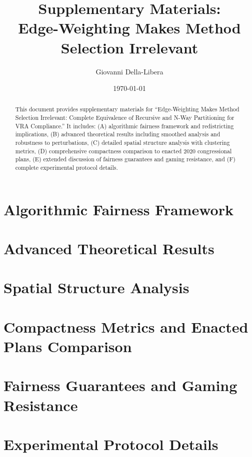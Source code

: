\documentclass[12pt,letterpaper]{article}
\title{\textbf{Supplementary Materials:\\
Edge-Weighting Makes Method Selection Irrelevant}}
\author{
    Giovanni Della-Libera
}
\date{\today}
\begin{document}
\maketitle

\begin{abstract}
This document provides supplementary materials for ``Edge-Weighting Makes Method Selection Irrelevant: Complete Equivalence of Recursive and N-Way Partitioning for VRA Compliance.'' It includes: (A) algorithmic fairness framework and redistricting implications, (B) advanced theoretical results including smoothed analysis and robustness to perturbations, (C) detailed spatial structure analysis with clustering metrics, (D) comprehensive compactness comparison to enacted 2020 congressional plans, (E) extended discussion of fairness guarantees and gaming resistance, and (F) complete experimental protocol details.
\end{abstract}

\singlespacing
\tableofcontents
\clearpage

\doublespacing

\appendix

\section{Algorithmic Fairness Framework}
\label{sup:fairness}


\section{Advanced Theoretical Results}
\label{sup:theory}


\section{Spatial Structure Analysis}
\label{sup:spatial}


\section{Compactness Metrics and Enacted Plans Comparison}
\label{sup:compactness}


\section{Fairness Guarantees and Gaming Resistance}
\label{sup:guarantees}


\section{Experimental Protocol Details}
\label{sup:protocol}


\singlespacing

\end{document}
